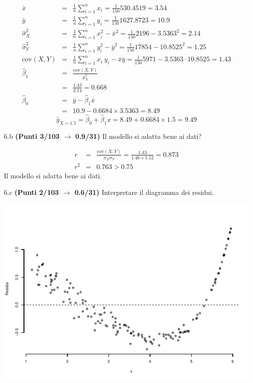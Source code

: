 \documentclass[
  11pt,
]{book}
\theoremstyle{mytheoremstyle}
\theoremstyle{mydefstyle}
\newenvironment{sol}
  {
  \begin{tcolorbox}[enhanced,breakable,arc=0.1mm,boxrule=1pt,colback=white,colframe=iblue,
  title=\bf \fontfamily{lmss}\selectfont \hspace{.5 cm} Soluzione,drop fuzzy shadow]

}{
\end{tcolorbox}
  }
\begin{document}
\begin{sol}
\begin{eqnarray*}
           \bar x &=&\frac 1 n\sum_{i=1}^n x_i = \frac {1}{ 150 }  530.4519 =  3.54 \\
           \bar y &=&\frac 1 n\sum_{i=1}^n y_i = \frac {1}{ 150 }  1627.8723 =  10.9 \\
           \hat\sigma_X^2&=&\frac 1 n\sum_{i=1}^n x_i^2-\bar x^2=\frac {1}{ 150 }  2196  - 3.5363 ^2= 2.14 \\
           \hat\sigma_Y^2&=&\frac 1 n\sum_{i=1}^n y_i^2-\bar y^2=\frac {1}{ 150 }  17854  - 10.8525 ^2= 1.25 \\
           \text{cov}(X,Y)&=&\frac 1 n\sum_{i=1}^n x_i~y_i-\bar x\bar y=\frac {1}{ 150 }  5971 - 3.5363 \cdot 10.8525 = 1.43 \\
           \hat\beta_1 &=& \frac{\text{cov}(X,Y)}{\hat\sigma_X^2} \\
                    &=& \frac{ 1.43 }{ 2.14 }  =  0.668 \\
           \hat\beta_0 &=& \bar y - \hat\beta_1 \bar x\\
                    &=&  10.9 - 0.6684 \times  3.5363 = 8.49 
         \end{eqnarray*}\[\hat y_{X= 1.5 }=\hat\beta_0+\hat\beta_1 x= 8.49 + 0.6684 \times 1.5 = 9.49 \]

\end{sol}

6.b \textbf{(Punti 3/103 \(\rightarrow\) 0.9/31)} Il modello si adatta bene ai dati?

\begin{sol}
\begin{eqnarray*}
r&=&\frac{\text{cov}(X,Y)}{\sigma_X\sigma_Y}=\frac{ 1.43 }{ 1.46 \times 1.12 }= 0.873 \\r^2&=& 0.763 > 0.75
\end{eqnarray*}
Il modello si adatta bene ai dati.

\end{sol}

6.c \textbf{(Punti 2/103 \(\rightarrow\) 0.6/31)} Interpretare il diagramma dei residui.

\begin{center}\includegraphics{Esami_passati_con_soluzioni_files/figure-latex/2023-25,-1} \end{center}
\end{document}
